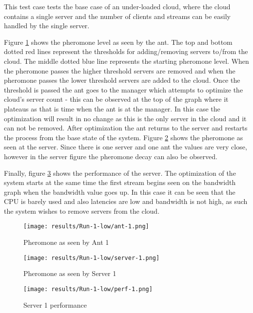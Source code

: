 This test case tests the base case of an under-loaded cloud, where the cloud contains a single server and the number of clients and streams can be easily handled by the single server.

Figure \ref{fig:1serv-ant} shows the pheromone level as seen by the ant. The top and bottom dotted red lines represent the thresholds for adding/removing servers to/from the cloud. The middle dotted blue line represents the starting pheromone level. When the pheromone passes the higher threshold servers are removed and when the pheromone passes the lower threshold servers are added to the cloud. Once the threshold is passed the ant goes to the manager which attempts to optimize the cloud's server count - this can be observed at the top of the graph where it plateaus as that is time when the ant is at the manager. In this case the optimization will result in no change as this is the only server in the cloud and it can not be removed. After optimization the ant returns to the server and restarts the process from the base state of the system. Figure \ref{fig:1serv-pher} shows the pheromone as seen at the server. Since there is one server and one ant the values are very close, however in the server figure the pheromone decay can also be observed. 

Finally, figure \ref{fig:1serv-perf} shows the performance of the server. The optimization of the system starts at the same time the first stream begins seen on the bandwidth graph when the bandwidth value goes up. In this case it can be seen that the CPU is barely used and also latencies are low and bandwidth is not high, as such the system wishes to remove servers from the cloud.

\begin{figure}
	\centering
		\texttt{[image: results/Run-1-low/ant-1.png]}
	\caption{Pheromone as seen by Ant 1}
	\label{fig:1serv-ant}
\end{figure}

\begin{figure}
	\centering
		\texttt{[image: results/Run-1-low/server-1.png]}
	\caption{Pheromone as seen by Server 1}
	\label{fig:1serv-pher}
\end{figure}

\begin{figure}
	\centering
		\texttt{[image: results/Run-1-low/perf-1.png]}
	\caption{Server 1 performance}
	\label{fig:1serv-perf}
\end{figure}

